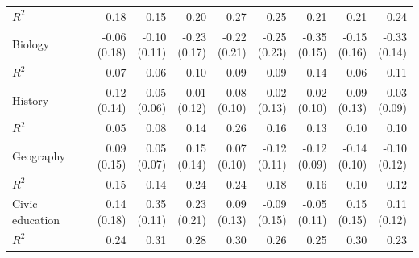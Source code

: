 \begin{tabular}{@{}lrrrrrrrr@{}}
\quad $R^2$ & 0.18 & 0.15 & 0.20 & 0.27 & 0.25 & 0.21 & 0.21 & 0.24 \\
Biology & \makecell[r]{-0.06 \\ (0.18)} & \makecell[r]{-0.10 \\ (0.11)} & \makecell[r]{-0.23 \\ (0.17)} & \makecell[r]{-0.22 \\ (0.21)} & \makecell[r]{-0.25 \\ (0.23)} & \makecell[r]{-0.35 \\ (0.15)} & \makecell[r]{-0.15 \\ (0.16)} & \makecell[r]{-0.33 \\ (0.14)} \\
\quad $R^2$ & 0.07 & 0.06 & 0.10 & 0.09 & 0.09 & 0.14 & 0.06 & 0.11 \\
History & \makecell[r]{-0.12 \\ (0.14)} & \makecell[r]{-0.05 \\ (0.06)} & \makecell[r]{-0.01 \\ (0.12)} & \makecell[r]{0.08 \\ (0.10)} & \makecell[r]{-0.02 \\ (0.13)} & \makecell[r]{0.02 \\ (0.10)} & \makecell[r]{-0.09 \\ (0.13)} & \makecell[r]{0.03 \\ (0.09)} \\
\quad $R^2$ & 0.05 & 0.08 & 0.14 & 0.26 & 0.16 & 0.13 & 0.10 & 0.10 \\
Geography & \makecell[r]{0.09 \\ (0.15)} & \makecell[r]{0.05 \\ (0.07)} & \makecell[r]{0.15 \\ (0.14)} & \makecell[r]{0.07 \\ (0.10)} & \makecell[r]{-0.12 \\ (0.11)} & \makecell[r]{-0.12 \\ (0.09)} & \makecell[r]{-0.14 \\ (0.10)} & \makecell[r]{-0.10 \\ (0.12)} \\
\quad $R^2$ & 0.15 & 0.14 & 0.24 & 0.24 & 0.18 & 0.16 & 0.10 & 0.12 \\
Civic education & \makecell[r]{0.14 \\ (0.18)} & \makecell[r]{0.35 \\ (0.11)} & \makecell[r]{0.23 \\ (0.21)} & \makecell[r]{0.09 \\ (0.13)} & \makecell[r]{-0.09 \\ (0.15)} & \makecell[r]{-0.05 \\ (0.11)} & \makecell[r]{0.15 \\ (0.15)} & \makecell[r]{0.11 \\ (0.12)} \\
\quad $R^2$ & 0.24 & 0.31 & 0.28 & 0.30 & 0.26 & 0.25 & 0.30 & 0.23 \\
\bottomrule
\end{tabular}
